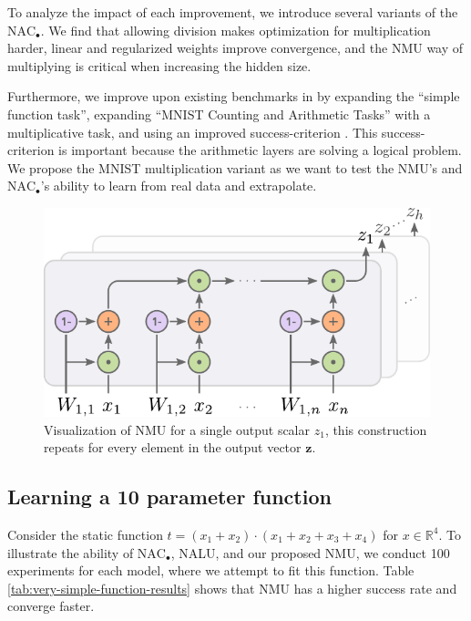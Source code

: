 To analyze the impact of each improvement, we introduce several variants of the $\text{NAC}_{\bullet}$.
We find that allowing division makes optimization for multiplication harder, linear and regularized weights improve convergence, and the NMU way of multiplying is critical when increasing the hidden size.

Furthermore, we improve upon existing benchmarks in \citet{trask-nalu} by expanding the ``simple function task'', expanding ``MNIST Counting and Arithmetic Tasks'' with a multiplicative task, and using an improved success-criterion \citet{maep-madsen-johansen-2019}.
This success-criterion is important because the arithmetic layers are solving a logical problem.
We propose the MNIST multiplication variant as we want to test the NMU’s and $\text{NAC}_{\bullet}$’s ability to learn from real data and extrapolate.

\begin{figure}[t]
\centering
\vspace{-1em}
\includegraphics[scale=0.65]{graphics/nmu.pdf}
\caption{Visualization of NMU for a single output scalar $z_1$, this construction repeats for every element in the output vector $\mathbf{z}$.}
\end{figure}

\subsection{Learning a 10 parameter function}
Consider the static function $t = (x_1 + x_2) \cdot (x_1 + x_2 + x_3 + x_4)$ for $x \in \mathbb{R}^4$. To illustrate the ability of $\mathrm{NAC}_{\bullet}$, NALU, and our proposed NMU, we conduct 100 experiments for each model, where we attempt to fit this function. Table \ref{tab:very-simple-function-results} shows that NMU has a higher success rate and converge faster.

